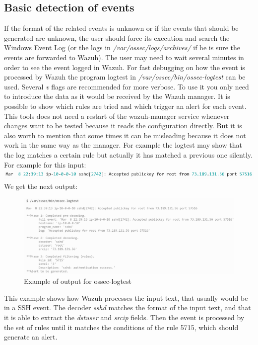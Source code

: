 \subsection*{Basic detection of events}
If the format of the related events is unknown or if the events that should be generated are unknown, the user should force its execution and search the Windows Event Log (or the logs in \textit{/var/ossec/logs/archives/} if he is sure the events are forwarded to Wazuh).
The user may need to wait several minutes in order to see the event logged in Wazuh.
\linej
\linej
For fast debugging on how the event is processed by Wazuh the program logtest in \textit{/var/ossec/bin/ossec-logtest} can be used.
Several \textit{v} flags are recommended for more verbose.
To use it you only need to introduce the data as it would be received by the Wazuh manager.
It is possible to show which rules are tried and which trigger an alert for each event.
This tools does not need a restart of the wazuh-manager service whenever changes want to be tested because it reads the configuration directly.
\linej
But it is also worth to mention that some times it can be misleading because it does not work in the same way as the manager.
For example the logtest may show that the log matches a certain rule but actually it has matched a previous one silently.
\linej
\linej
For example for this input:
\linej
\includegraphics[width=\textwidth]{figuras/ossec-logtest_input.png}
\linej
We get the next output:
\begin{figure}[H]
  \centering
	\includegraphics[width=\textwidth]{figuras/ossec-logtest_output.png}
	\caption{Example of output for ossec-logtest}
\end{figure}
\linej
This example shows how Wazuh processes the input text, that usually would be in a SSH event.
The decoder \textit{sshd} matches the format of the input text, and that it is able to extract the \textit{dstuser} and \textit{srcip} fields.
Then the event is processed by the set of rules until it matches the conditions of the rule 5715, which should generate an alert.
